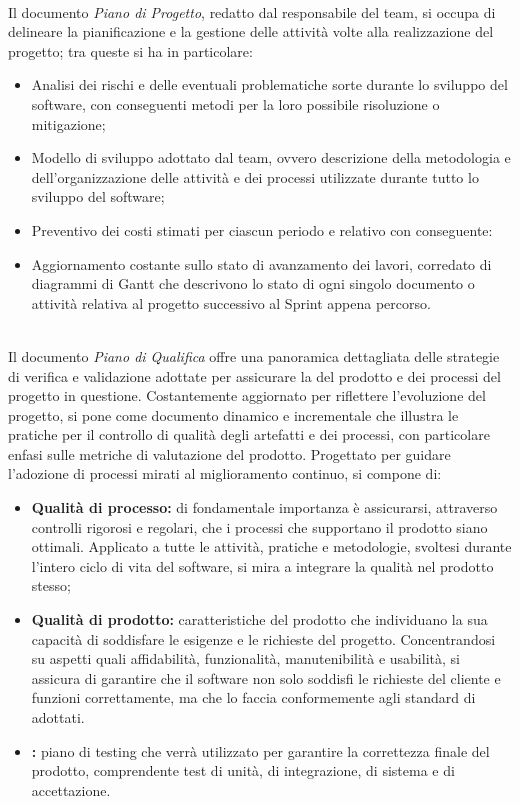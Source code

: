 \\
Il documento \textit{Piano di Progetto}, redatto dal responsabile del team, si occupa di delineare la pianificazione e la gestione delle attività volte alla realizzazione del progetto; tra queste si ha in particolare:
\begin{itemize}
    \item Analisi dei rischi e delle eventuali problematiche sorte durante lo sviluppo del software, con conseguenti metodi per la loro possibile risoluzione o mitigazione;
    \item Modello di sviluppo adottato dal team, ovvero descrizione della metodologia e dell'organizzazione delle attività e dei processi utilizzate durante tutto lo sviluppo del software; 
    \item Preventivo dei costi stimati per ciascun periodo e relativo  con conseguente:
    \item Aggiornamento costante sullo stato di avanzamento dei lavori, corredato di diagrammi di Gantt che descrivono lo stato di ogni singolo documento o attività relativa al progetto successivo al Sprint appena percorso.
\end{itemize}

\\
Il documento \textit{Piano di Qualifica} offre una panoramica dettagliata delle strategie di verifica e validazione adottate per assicurare la  del prodotto e dei processi del progetto in questione. Costantemente aggiornato per riflettere l'evoluzione del progetto, si pone come documento dinamico e incrementale che illustra le pratiche per il controllo di qualità degli artefatti e dei processi, con particolare enfasi sulle metriche di valutazione del prodotto. Progettato per guidare l'adozione di processi mirati al miglioramento continuo, si compone di:
\begin{itemize}
    \item \textbf{Qualità di processo:} di fondamentale importanza è assicurarsi, attraverso controlli rigorosi e regolari, che i processi che supportano il prodotto siano ottimali. Applicato a tutte le attività, pratiche e metodologie, svoltesi durante l'intero ciclo di vita del software, si mira a integrare la qualità nel prodotto stesso;
    \item \textbf{Qualità di prodotto:} caratteristiche del prodotto che individuano la sua capacità di soddisfare le esigenze e le richieste del progetto. Concentrandosi su aspetti quali affidabilità, funzionalità, manutenibilità e usabilità, si assicura di garantire che il software non solo soddisfi le richieste del cliente e funzioni correttamente, ma che lo faccia conformemente agli standard di  adottati.
    \item \textbf{:} piano di testing che verrà utilizzato per garantire la correttezza finale del prodotto, comprendente test di unità, di integrazione, di sistema e di accettazione.
\end{itemize} 

